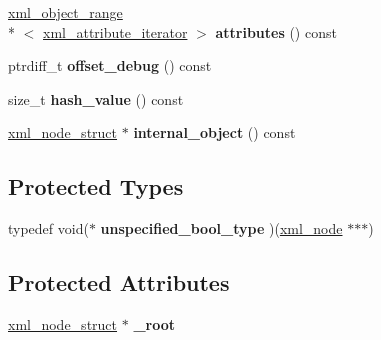 \begin{DoxyCompactItemize}
\item 
\hypertarget{classpugi_1_1xml__node_a35f616e0f529ec690b06ff0760d3f969}{\hyperlink{classpugi_1_1xml__object__range}{xml\+\_\+object\+\_\+range}\\*
$<$ \hyperlink{classpugi_1_1xml__attribute__iterator}{xml\+\_\+attribute\+\_\+iterator} $>$ {\bfseries attributes} () const }\label{classpugi_1_1xml__node_a35f616e0f529ec690b06ff0760d3f969}

\item 
\hypertarget{classpugi_1_1xml__node_a77b819bd87978bebefe75d421a793cf3}{ptrdiff\+\_\+t {\bfseries offset\+\_\+debug} () const }\label{classpugi_1_1xml__node_a77b819bd87978bebefe75d421a793cf3}

\item 
\hypertarget{classpugi_1_1xml__node_a5abfc3ec37d1dd9cd0aee6a46d6cf88d}{size\+\_\+t {\bfseries hash\+\_\+value} () const }\label{classpugi_1_1xml__node_a5abfc3ec37d1dd9cd0aee6a46d6cf88d}

\item 
\hypertarget{classpugi_1_1xml__node_a73e846c7ca8f6961a88150010c362ec6}{\hyperlink{structpugi_1_1xml__node__struct}{xml\+\_\+node\+\_\+struct} $\ast$ {\bfseries internal\+\_\+object} () const }\label{classpugi_1_1xml__node_a73e846c7ca8f6961a88150010c362ec6}

\end{DoxyCompactItemize}
\subsection*{Protected Types}
\begin{DoxyCompactItemize}
\item 
\hypertarget{classpugi_1_1xml__node_a5787a5097d439a75a335290cb6fcf2a8}{typedef void($\ast$ {\bfseries unspecified\+\_\+bool\+\_\+type} )(\hyperlink{classpugi_1_1xml__node}{xml\+\_\+node} $\ast$$\ast$$\ast$)}\label{classpugi_1_1xml__node_a5787a5097d439a75a335290cb6fcf2a8}

\end{DoxyCompactItemize}
\subsection*{Protected Attributes}
\begin{DoxyCompactItemize}
\item 
\hypertarget{classpugi_1_1xml__node_a45a5b342de1e37a60565f7693f03cc08}{\hyperlink{structpugi_1_1xml__node__struct}{xml\+\_\+node\+\_\+struct} $\ast$ {\bfseries \+\_\+root}}\label{classpugi_1_1xml__node_a45a5b342de1e37a60565f7693f03cc08}

\end{DoxyCompactItemize}

